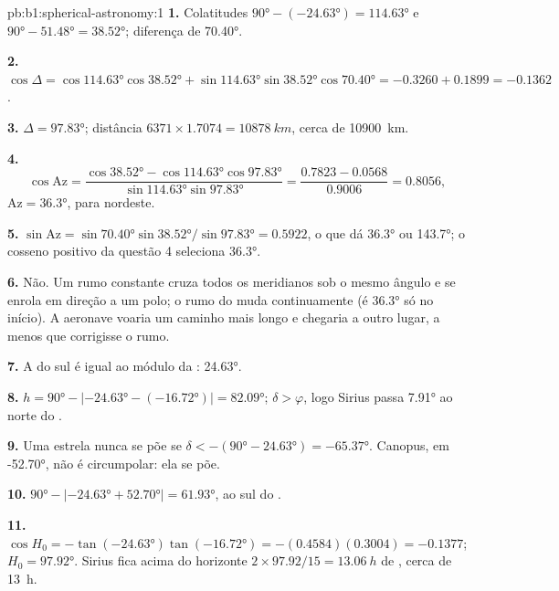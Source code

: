 \begin{solution}{pb:b1:spherical-astronomy:1}
\textbf{1.} Colatitudes $\ang{90} - (\ang{-24.63}) = \ang{114.63}$ e
$\ang{90} - \ang{51.48} = \ang{38.52}$; diferença de  \ang{70.40}.

\textbf{2.} $\cos\Delta = \cos\ang{114.63}\cos\ang{38.52} +
\sin\ang{114.63}\sin\ang{38.52}\cos\ang{70.40} = -0.3260 + 0.1899 =
-0.1362$.

\textbf{3.} $\Delta = \ang{97.83}$; distância $6371\times1.7074 =
\qty{10878}{km}$, cerca de \qty{10900}{km}.

\textbf{4.}
\[
  \cos\mathrm{Az} = \frac{\cos\ang{38.52} - \cos\ang{114.63}\cos\ang{97.83}}
  {\sin\ang{114.63}\sin\ang{97.83}} = \frac{0.7823 - 0.0568}{0.9006} = 0.8056 ,
\]
$\mathrm{Az} = \ang{36.3}$, para nordeste.

\textbf{5.} $\sin\mathrm{Az} = \sin\ang{70.40}\sin\ang{38.52}/\sin\ang{97.83}
= 0.5922$, o que dá \ang{36.3} ou \ang{143.7}; o cosseno positivo da
questão 4 seleciona \ang{36.3}.

\textbf{6.} Não. Um rumo constante cruza todos os meridianos sob o mesmo ângulo
e se enrola em direção a um polo; o rumo do  muda continuamente
(é \ang{36.3} só no início). A aeronave voaria um caminho mais longo e chegaria
a outro lugar, a menos que corrigisse o rumo.

\textbf{7.} A  do  sul é igual ao módulo da :
\ang{24.63}.

\textbf{8.} $h = \ang{90} - |\ang{-24.63} - (\ang{-16.72})| = \ang{82.09}$;
$\delta > \varphi$, logo Sirius passa \ang{7.91} ao norte do .

\textbf{9.} Uma estrela nunca se põe se $\delta < -(\ang{90} - \ang{24.63}) =
\ang{-65.37}$. Canopus, em \ang{-52.70}, não é circumpolar: ela se põe.

\textbf{10.} $\ang{90} - |\ang{-24.63} + \ang{52.70}| = \ang{61.93}$, ao sul
do .

\textbf{11.} $\cos H_0 = -\tan(\ang{-24.63})\tan(\ang{-16.72}) =
-(0.4584)(0.3004) = -0.1377$; $H_0 = \ang{97.92}$. Sirius fica acima do horizonte
$2\times97.92/15 = \qty{13.06}{h}$ de , cerca de \qty{13}{h}.


\end{solution}
